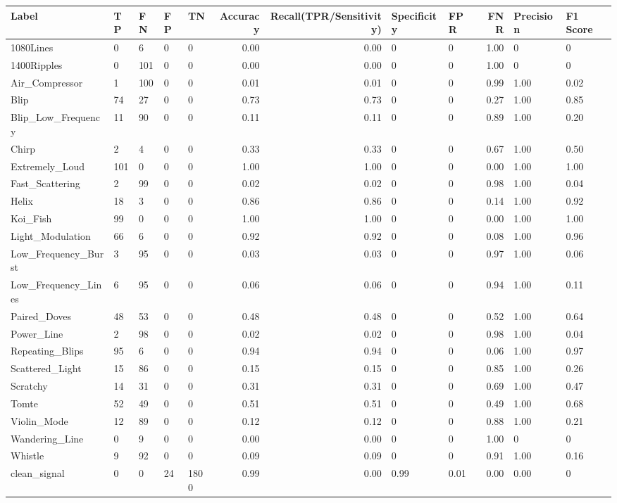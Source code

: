 \begin{tabular}{lllllrrllrll}
\toprule
Label & TP & FN & FP & TN & Accuracy & Recall(TPR/Sensitivity) & Specificity & FPR & FNR & Precision & F1 Score \\
\midrule
1080Lines & 0 & 6 & 0 & 0 & 0.00 & 0.00 & 0 & 0 & 1.00 & 0 & 0 \\
1400Ripples & 0 & 101 & 0 & 0 & 0.00 & 0.00 & 0 & 0 & 1.00 & 0 & 0 \\
Air_Compressor & 1 & 100 & 0 & 0 & 0.01 & 0.01 & 0 & 0 & 0.99 & 1.00 & 0.02 \\
Blip & 74 & 27 & 0 & 0 & 0.73 & 0.73 & 0 & 0 & 0.27 & 1.00 & 0.85 \\
Blip_Low_Frequency & 11 & 90 & 0 & 0 & 0.11 & 0.11 & 0 & 0 & 0.89 & 1.00 & 0.20 \\
Chirp & 2 & 4 & 0 & 0 & 0.33 & 0.33 & 0 & 0 & 0.67 & 1.00 & 0.50 \\
Extremely_Loud & 101 & 0 & 0 & 0 & 1.00 & 1.00 & 0 & 0 & 0.00 & 1.00 & 1.00 \\
Fast_Scattering & 2 & 99 & 0 & 0 & 0.02 & 0.02 & 0 & 0 & 0.98 & 1.00 & 0.04 \\
Helix & 18 & 3 & 0 & 0 & 0.86 & 0.86 & 0 & 0 & 0.14 & 1.00 & 0.92 \\
Koi_Fish & 99 & 0 & 0 & 0 & 1.00 & 1.00 & 0 & 0 & 0.00 & 1.00 & 1.00 \\
Light_Modulation & 66 & 6 & 0 & 0 & 0.92 & 0.92 & 0 & 0 & 0.08 & 1.00 & 0.96 \\
Low_Frequency_Burst & 3 & 95 & 0 & 0 & 0.03 & 0.03 & 0 & 0 & 0.97 & 1.00 & 0.06 \\
Low_Frequency_Lines & 6 & 95 & 0 & 0 & 0.06 & 0.06 & 0 & 0 & 0.94 & 1.00 & 0.11 \\
Paired_Doves & 48 & 53 & 0 & 0 & 0.48 & 0.48 & 0 & 0 & 0.52 & 1.00 & 0.64 \\
Power_Line & 2 & 98 & 0 & 0 & 0.02 & 0.02 & 0 & 0 & 0.98 & 1.00 & 0.04 \\
Repeating_Blips & 95 & 6 & 0 & 0 & 0.94 & 0.94 & 0 & 0 & 0.06 & 1.00 & 0.97 \\
Scattered_Light & 15 & 86 & 0 & 0 & 0.15 & 0.15 & 0 & 0 & 0.85 & 1.00 & 0.26 \\
Scratchy & 14 & 31 & 0 & 0 & 0.31 & 0.31 & 0 & 0 & 0.69 & 1.00 & 0.47 \\
Tomte & 52 & 49 & 0 & 0 & 0.51 & 0.51 & 0 & 0 & 0.49 & 1.00 & 0.68 \\
Violin_Mode & 12 & 89 & 0 & 0 & 0.12 & 0.12 & 0 & 0 & 0.88 & 1.00 & 0.21 \\
Wandering_Line & 0 & 9 & 0 & 0 & 0.00 & 0.00 & 0 & 0 & 1.00 & 0 & 0 \\
Whistle & 9 & 92 & 0 & 0 & 0.09 & 0.09 & 0 & 0 & 0.91 & 1.00 & 0.16 \\
clean_signal & 0 & 0 & 24 & 1800 & 0.99 & 0.00 & 0.99 & 0.01 & 0.00 & 0.00 & 0 \\
\bottomrule
\end{tabular}
